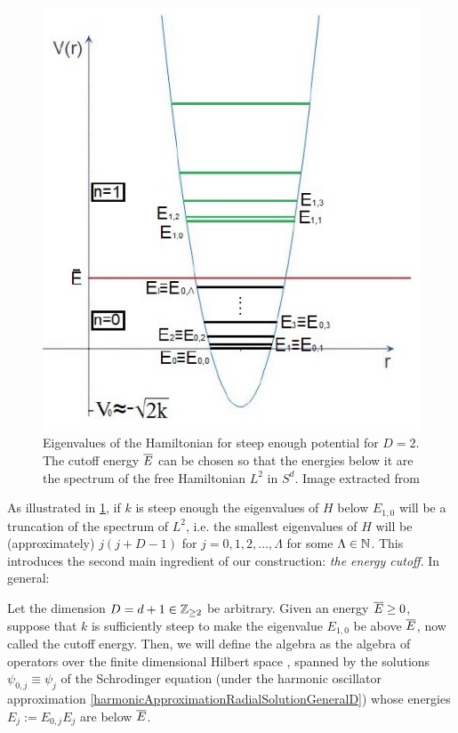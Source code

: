 \begin{figure}[h]
    \centering
    \includegraphics[width = \textwidth/2]{images/FioreEigenvalues.PNG}
    \caption{Eigenvalues of the Hamiltonian for steep enough potential for $D = 2$. The cutoff energy $\overline{E}$ can be chosen so that the energies below it are the spectrum of the free Hamiltonian $L^2$ in $S^d$. Image extracted from \cite{Fiore2018}}
    \label{fig:D2EigenvaluesEigenEnergiesHarmonicCutoff}
\end{figure}

As illustrated in \ref{fig:D2EigenvaluesEigenEnergiesHarmonicCutoff}, if $k$ is steep enough%
the eigenvalues of $H$ below $E_{1,0}$ will be a truncation of the spectrum of $L^2$, i.e. the smallest eigenvalues of $H$ will be (approximately) $j(j+D-1)$ for $j = 0, 1, 2, \dots, \Lambda$ for some $\Lambda \in \mathbb{N}$. This introduces the second main ingredient of our construction: \emph{the energy cutoff}. In general:
\begin{definition}\label{definitionAcalHcalGeneralD}
Let the dimension $D = d + 1 \in \mathbb{Z}_{\geq 2}$ be arbitrary. Given an energy $\overline{E} \geq 0$, suppose that $k$ is sufficiently steep to make the eigenvalue $E_{1, 0}$ be above $\overline{E}$, now called the cutoff energy. %
Then, we will define the algebra  as the algebra of operators over the finite dimensional Hilbert space , spanned by the solutions $\psi_{0, j} \equiv \psi_j$ of the Schrodinger equation (under the harmonic oscillator approximation \eqref{harmonicApproximationRadialSolutionGeneralD}) whose energies $E_j := E_{0, j}E_j$ are below $\overline{E}$.
\end{definition}

